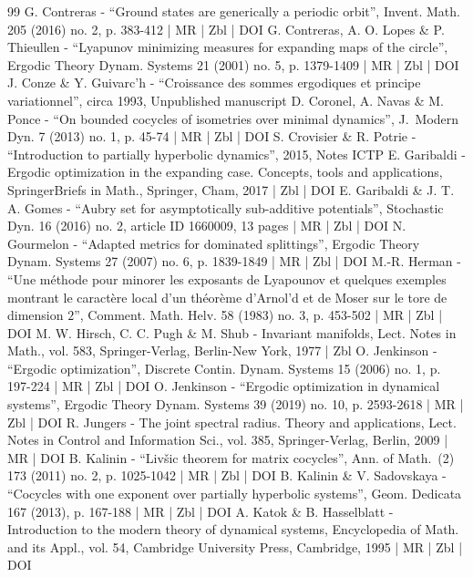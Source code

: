 \begin{thebibliography}{99}
G. Contreras - “Ground states are generically a periodic orbit”, Invent. Math. 205 (2016) no. 2, p. 383-412 | MR | Zbl | DOI
G. Contreras, A. O. Lopes \& P. Thieullen - “Lyapunov minimizing measures for expanding maps of the circle”, Ergodic Theory Dynam. Systems 21 (2001) no. 5, p. 1379-1409 | MR | Zbl | DOI
J. Conze \& Y. Guivarc’h - “Croissance des sommes ergodiques et principe variationnel”, circa 1993, Unpublished manuscript
D. Coronel, A. Navas \& M. Ponce - “On bounded cocycles of isometries over minimal dynamics”, J. Modern Dyn. 7 (2013) no. 1, p. 45-74 | MR | Zbl | DOI
S. Crovisier \& R. Potrie - “Introduction to partially hyperbolic dynamics”, 2015, Notes ICTP
E. Garibaldi - Ergodic optimization in the expanding case. Concepts, tools and applications, SpringerBriefs in Math., Springer, Cham, 2017 | Zbl | DOI
E. Garibaldi \& J. T. A. Gomes - “Aubry set for asymptotically sub-additive potentials”, Stochastic Dyn. 16 (2016) no. 2, article ID 1660009, 13 pages | MR | Zbl | DOI
N. Gourmelon - “Adapted metrics for dominated splittings”, Ergodic Theory Dynam. Systems 27 (2007) no. 6, p. 1839-1849 | MR | Zbl | DOI
M.-R. Herman - “Une méthode pour minorer les exposants de Lyapounov et quelques exemples montrant le caractère local d’un théorème d’Arnol’d et de Moser sur le tore de dimension $2$”, Comment. Math. Helv. 58 (1983) no. 3, p. 453-502 | MR | Zbl | DOI
M. W. Hirsch, C. C. Pugh \& M. Shub - Invariant manifolds, Lect. Notes in Math., vol. 583, Springer-Verlag, Berlin-New York, 1977 | Zbl
O. Jenkinson - “Ergodic optimization”, Discrete Contin. Dynam. Systems 15 (2006) no. 1, p. 197-224 | MR | Zbl | DOI
O. Jenkinson - “Ergodic optimization in dynamical systems”, Ergodic Theory Dynam. Systems 39 (2019) no. 10, p. 2593-2618 | MR | Zbl | DOI
R. Jungers - The joint spectral radius. Theory and applications, Lect. Notes in Control and Information Sci., vol. 385, Springer-Verlag, Berlin, 2009 | MR | DOI
B. Kalinin - “Livšic theorem for matrix cocycles”, Ann. of Math. (2) 173 (2011) no. 2, p. 1025-1042 | MR | Zbl | DOI
B. Kalinin \& V. Sadovskaya - “Cocycles with one exponent over partially hyperbolic systems”, Geom. Dedicata 167 (2013), p. 167-188 | MR | Zbl | DOI
A. Katok \& B. Hasselblatt - Introduction to the modern theory of dynamical systems, Encyclopedia of Math. and its Appl., vol. 54, Cambridge University Press, Cambridge, 1995 | MR | Zbl | DOI

\end{thebibliography}
